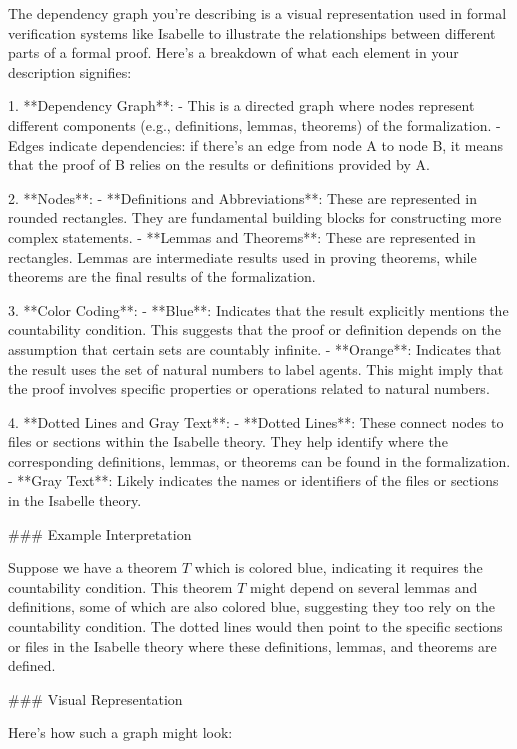 The dependency graph you're describing is a visual representation used in formal verification systems like Isabelle to illustrate the relationships between different parts of a formal proof. Here's a breakdown of what each element in your description signifies:

1. **Dependency Graph**:
   - This is a directed graph where nodes represent different components (e.g., definitions, lemmas, theorems) of the formalization.
   - Edges indicate dependencies: if there's an edge from node A to node B, it means that the proof of B relies on the results or definitions provided by A.

2. **Nodes**:
   - **Definitions and Abbreviations**: These are represented in rounded rectangles. They are fundamental building blocks for constructing more complex statements.
   - **Lemmas and Theorems**: These are represented in rectangles. Lemmas are intermediate results used in proving theorems, while theorems are the final results of the formalization.

3. **Color Coding**:
   - **Blue**: Indicates that the result explicitly mentions the countability condition. This suggests that the proof or definition depends on the assumption that certain sets are countably infinite.
   - **Orange**: Indicates that the result uses the set of natural numbers to label agents. This might imply that the proof involves specific properties or operations related to natural numbers.

4. **Dotted Lines and Gray Text**:
   - **Dotted Lines**: These connect nodes to files or sections within the Isabelle theory. They help identify where the corresponding definitions, lemmas, or theorems can be found in the formalization.
   - **Gray Text**: Likely indicates the names or identifiers of the files or sections in the Isabelle theory.

### Example Interpretation

Suppose we have a theorem \( T \) which is colored blue, indicating it requires the countability condition. This theorem \( T \) might depend on several lemmas and definitions, some of which are also colored blue, suggesting they too rely on the countability condition. The dotted lines would then point to the specific sections or files in the Isabelle theory where these definitions, lemmas, and theorems are defined.

### Visual Representation

Here’s how such a graph might look:

